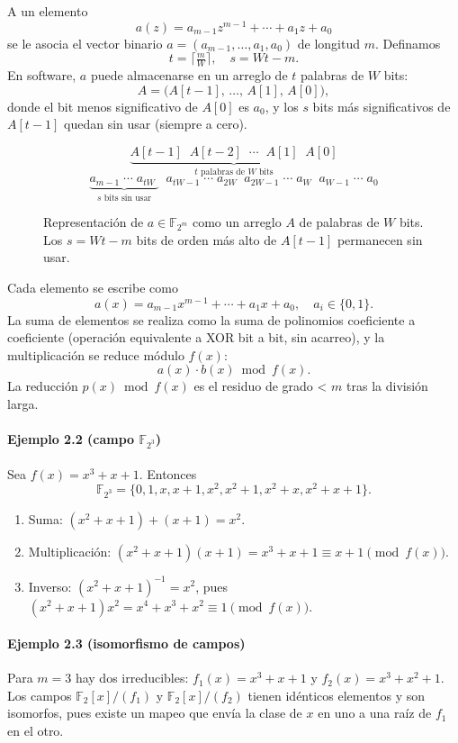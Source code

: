 A un elemento
\[
  a(z) = a_{m-1}z^{m-1} + \cdots + a_1 z + a_0
\]
se le asocia el vector binario
\(\displaystyle a = (a_{m-1},\dots,a_1,a_0)\) de longitud \(m\). Definamos
\[
  t = \bigl\lceil\tfrac{m}{W}\bigr\rceil,
  \quad
  s = Wt - m.
\]
En software, \(a\) puede almacenarse en un arreglo de \(t\) palabras de \(W\) bits:
\[
  A = \bigl(A[t-1],\,\dots,\,A[1],\,A[0]\bigr),
\]
donde el bit menos significativo de \(A[0]\) es \(a_0\), y los \(s\) bits más significativos de \(A[t-1]\) quedan sin usar (siempre a cero).

\begin{figure}[H]
\[
\underbrace{A[t-1]\;\;A[t-2]\;\;\cdots\;\;A[1]\;\;A[0]}_{\text{\(t\) palabras de \(W\) bits}}
\]
\[
\underbrace{a_{m-1}\;\cdots\;a_{tW}\;}_{s\text{ bits sin usar}}\;\;
a_{tW-1}\;\cdots\;a_{2W}\;\;
a_{2W-1}\;\cdots\;a_{W}\;\;
a_{W-1}\;\cdots\;a_{0}
\]
\caption{Representación de \(a\in\mathbb{F}_{2^m}\) como un arreglo \(A\) de palabras de \(W\) bits. Los \(s = Wt - m\) bits de orden más alto de \(A[t-1]\) permanecen sin usar.}
\label{fig:word_representation}
\end{figure}

Cada elemento se escribe como
\[
  a(x)=a_{m-1}x^{m-1}+\cdots+a_1x+a_0,\quad a_i\in\{0,1\}.
\]
La suma de elementos se realiza como la suma de polinomios coeficiente a coeficiente (operación equivalente a XOR bit a bit, sin acarreo), y la multiplicación se reduce módulo $f(x)$:
\[
  a(x)\cdot b(x)\bmod f(x).
\]
La reducción $p(x)\bmod f(x)$ es el residuo de grado < $m$ tras la división larga.

\paragraph{Ejemplo 2.2 (campo $\mathbb{F}_{2^3}$)}
Sea $f(x)=x^3+x+1$. Entonces
\[
  \mathbb{F}_{2^3}=\{0,1,x,x+1,x^2,x^2+1,x^2+x,x^2+x+1\}.
\]
\begin{enumerate}
  \item Suma: $(x^2+x+1)+(x+1)=x^2$.
  \item Multiplicación: $(x^2+x+1)(x+1)=x^3+x+1\equiv x+1\pmod{f(x)}$.
  \item Inverso: $(x^2+x+1)^{-1}=x^2$, pues $(x^2+x+1)x^2=x^4+x^3+x^2\equiv1\pmod{f(x)}$.
\end{enumerate}

\paragraph{Ejemplo 2.3 (isomorfismo de campos)}
Para $m=3$ hay dos irreducibles: $f_1(x)=x^3+x+1$ y $f_2(x)=x^3+x^2+1$. Los campos $\mathbb{F}_2[x]/(f_1)$ y $\mathbb{F}_2[x]/(f_2)$ tienen idénticos elementos y son isomorfos, pues existe un mapeo que envía la clase de $x$ en uno a una raíz de $f_1$ en el otro.

